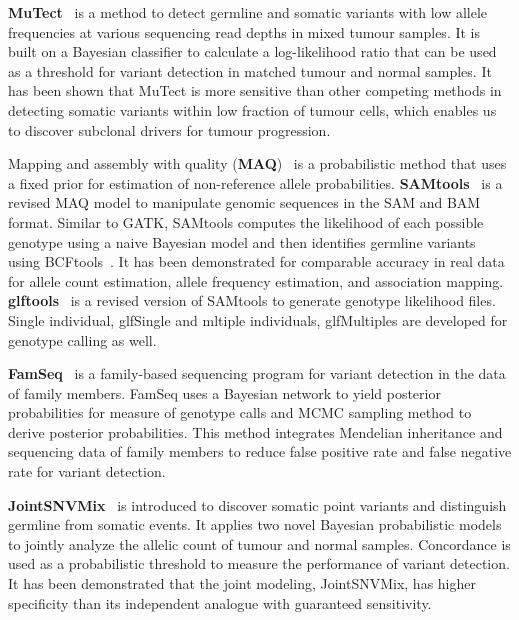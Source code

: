 \documentclass[a4,center,fleqn]{NAR}
\begin{document}
\textbf{MuTect}~\citep{Cibulskis2013} is a method to detect germline and somatic variants with low allele frequencies at various sequencing read depths in mixed tumour samples.
It is built on a Bayesian classifier to calculate a log-likelihood ratio that can be used as a threshold for variant detection in matched tumour and normal samples.
It has been shown that MuTect is more sensitive than other competing methods in detecting somatic variants within low fraction of tumour cells, which enables us to discover subclonal drivers for tumour progression.

Mapping and assembly with quality (\textbf{MAQ})~\citep{Li2008} is a probabilistic method that uses a fixed prior for estimation of non-reference allele probabilities.
\textbf{SAMtools}~\citep{Li2009a} is a revised MAQ model to manipulate genomic sequences in the SAM and BAM format.
Similar to GATK, SAMtools computes the likelihood of each possible genotype using a naive Bayesian model and then identifies germline variants using BCFtools~\citep{li2011statistical}.
It has been demonstrated for comparable accuracy in real data for allele count estimation, allele frequency estimation, and association mapping.
\textbf{glftools}~\citep{abecasis2010} is a revised version of SAMtools to generate genotype likelihood files.
Single individual, glfSingle and mltiple individuals, glfMultiples are developed for genotype calling as well.

\textbf{FamSeq}~\citep{Peng2013} is a family-based sequencing program for variant detection in the data of family members.
FamSeq uses a Bayesian network to yield posterior probabilities for measure of genotype calls and MCMC sampling method to derive posterior probabilities.
This method integrates Mendelian inheritance and sequencing data of family members to reduce false positive rate and false negative rate for variant detection.

\textbf{JointSNVMix}~\citep{Roth2012} is introduced to discover somatic point variants and distinguish germline from somatic events.
It applies two novel Bayesian probabilistic models to jointly analyze the allelic count of tumour and normal samples.
Concordance is used as a probabilistic threshold to measure the performance of variant detection.
It has been demonstrated that the joint modeling, JointSNVMix, has higher specificity than its independent analogue with guaranteed sensitivity.
\end{document}
